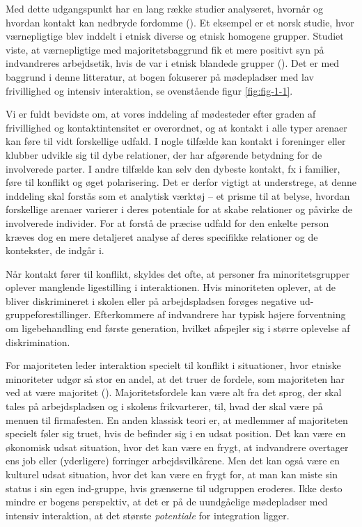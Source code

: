 \documentclass[
]{book}
\begin{document}
Med dette udgangspunkt har en lang række studier analyseret, hvornår og hvordan kontakt kan nedbryde fordomme (). Et eksempel er et norsk studie, hvor værnepligtige blev inddelt i etnisk diverse og etnisk homogene grupper. Studiet viste, at værnepligtige med majoritetsbaggrund fik et mere positivt syn på indvandreres arbejdsetik, hvis de var i etnisk blandede grupper (). Det er med baggrund i denne litteratur, at bogen fokuserer på mødepladser med lav frivillighed og intensiv interaktion, se ovenstående figur \ref{fig:fig-1-1}.

Vi er fuldt bevidste om, at vores inddeling af mødesteder efter graden af frivillighed og kontaktintensitet er overordnet, og at kontakt i alle typer arenaer kan føre til vidt forskellige udfald. I nogle tilfælde kan kontakt i foreninger eller klubber udvikle sig til dybe relationer, der har afgørende betydning for de involverede parter. I andre tilfælde kan selv den dybeste kontakt, fx i familier, føre til konflikt og øget polarisering. Det er derfor vigtigt at understrege, at denne inddeling skal forstås som et analytisk værktøj -- et prisme til at belyse, hvordan forskellige arenaer varierer i deres potentiale for at skabe relationer og påvirke de involverede individer. For at forstå de præcise udfald for den enkelte person kræves dog en mere detaljeret analyse af deres specifikke relationer og de kontekster, de indgår i.

Når kontakt fører til konflikt, skyldes det ofte, at personer fra minoritetsgrupper oplever manglende ligestilling i interaktionen. Hvis minoriteten oplever, at de bliver diskrimineret i skolen eller på arbejdspladsen forøges negative ud-gruppeforestillinger. Efterkommere af indvandrere har typisk højere forventning om ligebehandling end første generation, hvilket afspejler sig i større oplevelse af diskrimination.

For majoriteten leder interaktion specielt til konflikt i situationer, hvor etniske minoriteter udgør så stor en andel, at det truer de fordele, som majoriteten har ved at være majoritet (). Majoritetsfordele kan være alt fra det sprog, der skal tales på arbejdspladsen og i skolens frikvarterer, til, hvad der skal være på menuen til firmafesten. En anden klassisk teori er, at medlemmer af majoriteten specielt føler sig truet, hvis de befinder sig i en udsat position. Det kan være en økonomisk udsat situation, hvor det kan være en frygt, at indvandrere overtager ens job eller (yderligere) forringer arbejdsvilkårene. Men det kan også være en kulturel udsat situation, hvor det kan være en frygt for, at man kan miste sin status i sin egen ind-gruppe, hvis grænserne til udgruppen eroderes. Ikke desto mindre er bogens perspektiv, at det er på de uundgåelige mødepladser med intensiv interaktion, at det største \emph{potentiale} for integration ligger.
\end{document}
